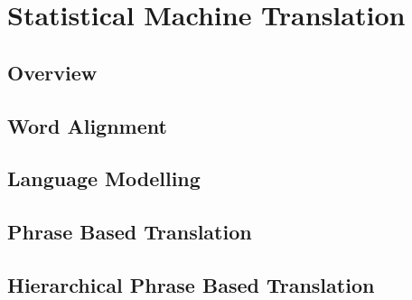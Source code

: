 \chapter{Statistical Machine Translation}


\section{Overview}


\section{Word Alignment}


\section{Language Modelling}


\section{Phrase Based Translation}


\section{Hierarchical Phrase Based Translation}

